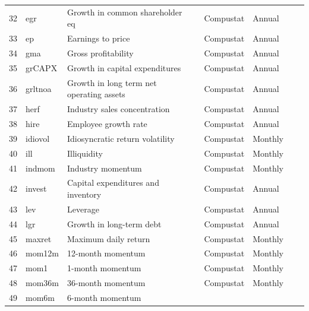 \documentclass[a4paper, table]{article}
\begin{document}
\begin{landscape}
\begin{center}
\begin{longtable}{llllllll}
			32 & egr & Growth in common shareholder eq & 
				\cite{richardson_accrual_2005} & Compustat & Annual \\
			33 & ep & Earnings to price & 
				\cite{basu_investment_1977} & Compustat & Annual \\
			34 & gma & Gross profitability & 
				\cite{novy-marx_other_2013} & Compustat & Annual \\
			35 & grCAPX\footnotemark[\value{footnote}] & Growth in capital expenditures & 
				\cite{anderson_empirical_2006} & Compustat & Annual \\
			36 & grltnoa\footnotemark[\value{footnote}] & Growth in long term net operating assets & 
				\cite{fairfield_accrued_2003} & Compustat & Annual \\
			37 & herf & Industry sales concentration & 
				\cite{hou_industry_2006} & Compustat & Annual \\
			38 & hire & Employee growth rate & 
				\cite{belo_labor_2014} & Compustat & Annual \\
			39 & idiovol & Idiosyncratic return volatility & 
				\cite{ali_arbitrage_2003} & Compustat & Monthly \\
			40 & ill & Illiquidity & 
				\cite{amihud_illiquidity_2002} & Compustat & Monthly \\
			41 & indmom & Industry momentum & 
				\cite{moskowitz_industries_1999} & Compustat & Monthly \\
			42 & invest\footnotemark[\value{footnote}] & Capital expenditures and inventory & 
				\cite{chen_better_2010} & Compustat & Annual \\
			43 & lev & Leverage & 
				\cite{bhandari_debt/equity_1988} & Compustat & Annual \\
			44 & lgr & Growth in long-term debt & 
				\cite{richardson_accrual_2005} & Compustat & Annual \\
			45 & maxret & Maximum daily return & 
				\cite{bali_maxing_2011} & Compustat & Monthly \\
			46 & mom12m & 12-month momentum & 
				\cite{jegadeesh_evidence_1990} & Compustat & Monthly \\
			47 & mom1 & 1-month momentum & 
				\cite{jegadeesh_returns_1993} & Compustat & Monthly \\
			48 & mom36m\footnotemark[\value{footnote}] & 36-month momentum & 
				\cite{jegadeesh_returns_1993} & Compustat & Monthly \\
			49 & mom6m & 6-month momentum & 

\end{longtable}
\end{center}
\end{landscape}
\end{document}
